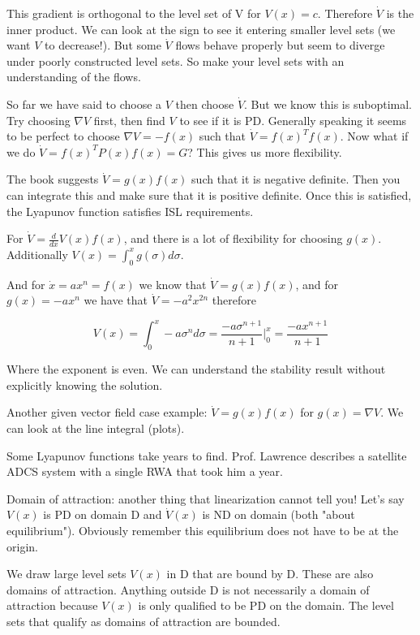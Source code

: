 \documentclass[11pt]{article}
\begin{document}
This gradient is orthogonal to the level set of V for $V(x)=c$. Therefore $\dot{V}$ is the inner product. We can look at the sign to see it entering smaller level sets (we want $V$ to decrease!). But some $\dot{V}$ flows behave properly but seem to diverge under poorly constructed level sets. So make your level sets with an understanding of the flows.

So far we have said to choose a $V$ then choose $\dot{V}$. But we know this is suboptimal. Try choosing $\nabla V$ first, then find $V$ to see if it is PD. Generally speaking it seems to be perfect to choose $\nabla{V} = -f(x)$ such that $\dot{V} = f(x)^Tf(x)$. Now what if we do $\dot{V} = f(x)^TP(x)f(x) = G$? This gives us more flexibility.

The book suggests $\dot{V} = g(x)f(x)$ such that it is negative definite. Then you can integrate this and make sure that it is positive definite. Once this is satisfied, the Lyapunov function satisfies ISL requirements.

For $\dot{V} = \frac{d}{dx}V(x)f(x)$, and there is a lot of flexibility for choosing $g(x)$. Additionally $V(x) = \int_0^x g(\sigma)d\sigma$. 

And for $\dot{x} = ax^n = f(x)$ we know that $\dot{V} = g(x)f(x)$, and for $g(x) = -ax^n$ we have that $\dot{V} = -a^2x^{2n}$ therefore 

\begin{equation}
V(x) = \int_0^x -a\sigma^nd\sigma = \frac{-a\sigma^{n+1}}{n+1} \Big \rvert_0^x = \frac{-ax^{n+1}}{n+1}	
\end{equation}

Where the exponent is even. We can understand the stability result without explicitly knowing the solution.

Another given vector field case example: $\dot{V} = g(x)f(x)$ for $g(x) = \nabla V$. We can look at the line integral (plots). 

Some Lyapunov functions take years to find. Prof. Lawrence describes a satellite ADCS system with a single RWA that took him a year.

Domain of attraction: another thing that linearization cannot tell you! Let's say $V(x)$ is PD on domain D and $\dot{V}(x)$ is ND on domain (both "about equilibrium"). Obviously remember this equilibrium does not have to be at the origin.

We draw large level sets $V(x)$ in D that are bound by D. These are also domains of attraction. Anything outside D is not necessarily a domain of attraction because $V(x)$ is only qualified to be PD on the domain. The level sets that qualify as domains of attraction are bounded.
\end{document}
